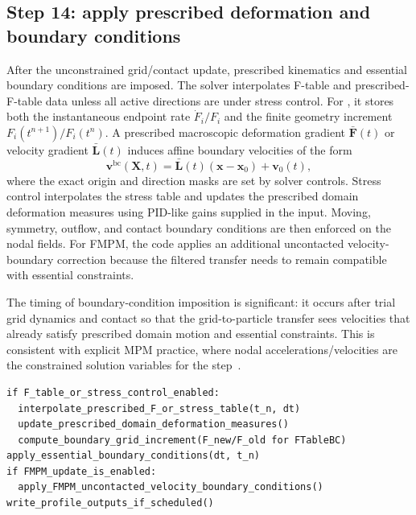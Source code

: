 \subsection{Step 14: apply prescribed deformation and boundary conditions}
\label{subsec:solver-step-14}
After the unconstrained grid/contact update, prescribed kinematics and essential boundary conditions are imposed.  The solver interpolates F-table and prescribed-F-table data unless all active directions are under stress control.  For , it stores both the instantaneous endpoint rate $\dot F_i/F_i$ and the finite geometry increment $F_i(t^{n+1})/F_i(t^n)$.  A prescribed macroscopic deformation gradient $\bar{\mathbf{F}}(t)$ or velocity gradient $\bar{\mathbf{L}}(t)$ induces affine boundary velocities of the form
\begin{equation}
  \mathbf{v}^{\mathrm{bc}}(\mathbf{X},t) = \bar{\mathbf{L}}(t)\left(\mathbf{x}-\mathbf{x}_0\right) + \mathbf{v}_0(t),
\end{equation}
where the exact origin and direction masks are set by solver controls.  Stress control interpolates the stress table and updates the prescribed domain deformation measures using PID-like gains supplied in the input.  Moving, symmetry, outflow, and contact boundary conditions are then enforced on the nodal fields.  For FMPM, the code applies an additional uncontacted velocity-boundary correction because the filtered transfer needs to remain compatible with essential constraints.

The timing of boundary-condition imposition is significant: it occurs after trial grid dynamics and contact so that the grid-to-particle transfer sees velocities that already satisfy prescribed domain motion and essential constraints.  This is consistent with explicit MPM practice, where nodal accelerations/velocities are the constrained solution variables for the step~\cite{wallstedt2008explicit,steffen2008choices}.

\begin{lstlisting}[caption={Prescribed deformation and essential boundary conditions.},basicstyle=\ttfamily\small]
if F_table_or_stress_control_enabled:
  interpolate_prescribed_F_or_stress_table(t_n, dt)
  update_prescribed_domain_deformation_measures()
  compute_boundary_grid_increment(F_new/F_old for FTableBC)
apply_essential_boundary_conditions(dt, t_n)
if FMPM_update_is_enabled:
  apply_FMPM_uncontacted_velocity_boundary_conditions()
write_profile_outputs_if_scheduled()
\end{lstlisting}

